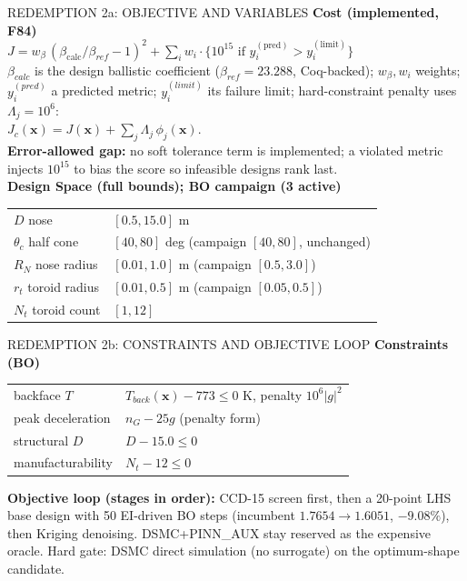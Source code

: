 \documentclass[aspectratio=169,11pt]{beamer}
\begin{document}
\begin{frame}{REDEMPTION 2a: OBJECTIVE AND VARIABLES}
  \small
  \textbf{Cost (implemented, F84)}\\
  $J = w_\beta\,(\beta_{\mathrm{calc}}/\beta_{ref}-1)^2 +
  \sum_i w_i\cdot\{10^{15}\text{ if }y_i^{(\mathrm{pred})} > y_i^{(\mathrm{limit})}\}$\\
  $\beta_{calc}$ is the design ballistic coefficient ($\beta_{ref}=23.288$, Coq-backed);
  $w_\beta,w_i$ weights; $y_i^{(pred)}$ a predicted metric;
  $y_i^{(limit)}$ its failure limit; hard-constraint penalty uses $\Lambda_j=10^6$:\\
  $J_c(\mathbf{x}) = J(\mathbf{x}) + \sum_j \Lambda_j\,\phi_j(\mathbf{x})$.\\
  \vspace{0.1cm}
  \textbf{Error-allowed gap:} no soft tolerance term is implemented; a violated
  metric injects $10^{15}$ to bias the score so infeasible designs rank last.\\
  \textbf{Design Space (full bounds); BO campaign (3 active)}\\
  \begin{tabular}{@{}ll@{}}
  \hline
  $D$ nose & $[0.5,15.0]$ m\\
  $\theta_c$ half cone & $[40,80]$ deg (campaign $[40,80]$, unchanged)\\
  $R_N$ nose radius & $[0.01,1.0]$ m (campaign $[0.5,3.0]$)\\
  $r_t$ toroid radius & $[0.01,0.5]$ m (campaign $[0.05,0.5]$)\\
  $N_t$ toroid count & $[1,12]$\\
  \hline
  \end{tabular}
\end{frame}
\begin{frame}{REDEMPTION 2b: CONSTRAINTS AND OBJECTIVE LOOP}
  \small
  \textbf{Constraints (BO)}\
  \begin{tabular}{@{}p{3.3cm}p{4.8cm}@{}}
  backface $T$ & $T_{back}(\mathbf{x})-773\le 0$ K, penalty $10^6 |g|^2$\\
  peak deceleration & $n_G-25g$ (penalty form)\\
  structural $D$ & $D-15.0\le 0$\\
  manufacturability & $N_t-12\le 0$\\
  \end{tabular}
  \vspace{0.2cm}
  \textbf{Objective loop (stages in order):} CCD-15 screen first, then a
  20-point LHS base design with 50 EI-driven BO steps (incumbent
  $1.7654\to1.6051$, $-9.08\%$), then Kriging denoising. DSMC+PINN\_AUX stay
  reserved as the expensive oracle. Hard gate: DSMC direct simulation
  (no surrogate) on the optimum-shape candidate.
\end{frame}
\end{document}
